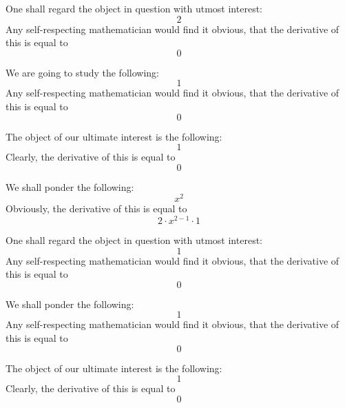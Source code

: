 \documentclass{article}
\begin{document}
One shall regard the object in question with utmost interest:
\begin{equation}
2 
\end{equation}
Any self-respecting mathematician would find it obvious, that the derivative of this is equal to
\begin{equation}
0 
\end{equation}

We are going to study the following:
\begin{equation}
1 
\end{equation}
Any self-respecting mathematician would find it obvious, that the derivative of this is equal to
\begin{equation}
0 
\end{equation}

The object of our ultimate interest is the following:
\begin{equation}
1 
\end{equation}
Clearly, the derivative of this is equal to
\begin{equation}
0 
\end{equation}

We shall ponder the following:
\begin{equation}
x ^{2 } 
\end{equation}
Obviously, the derivative of this is equal to
\begin{equation}
2 \cdot x ^{2 - 1 } \cdot 1 
\end{equation}

One shall regard the object in question with utmost interest:
\begin{equation}
1 
\end{equation}
Any self-respecting mathematician would find it obvious, that the derivative of this is equal to
\begin{equation}
0 
\end{equation}

We shall ponder the following:
\begin{equation}
1 
\end{equation}
Any self-respecting mathematician would find it obvious, that the derivative of this is equal to
\begin{equation}
0 
\end{equation}

The object of our ultimate interest is the following:
\begin{equation}
1 
\end{equation}
Clearly, the derivative of this is equal to
\begin{equation}
0 
\end{equation}
\end{document}

